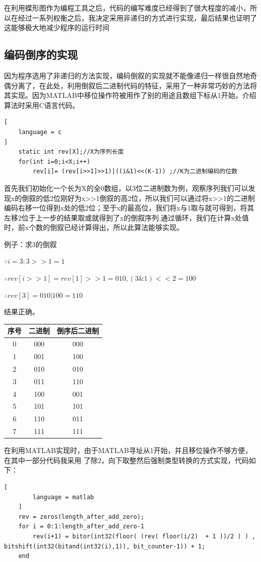 \documentclass{../source/zju}
\begin{document}
在利用蝶形图作为编程工具之后，代码的编写难度已经得到了很大程度的减小，所以在经过一系列权衡之后，我决定采用非递归的方式进行实现，最后结果也证明了这能够极大地减少程序的运行时间
\subsection{编码倒序的实现}
因为程序选用了非递归的方法实现，编码倒叙的实现就不能像递归一样很自然地奇偶分离了，在此处，利用倒叙后二进制代码的特征，采用了一种非常巧妙的方法将其实现。因为MATLAB中移位操作符被用作了别的用途且数组下标从1开始，介绍算法时采用C语言代码。
\begin{lstlisting}[
    language = c
]
    static int rev[X];//X为序列长度
    for(int i=0;i<X;i++)
        rev[i]= (rev[i>>1]>>1)|((i&1)<<(K-1)) ;//K为二进制编码的位数
\end{lstlisting}
首先我们初始化一个长为X的全0数组，以3位二进制数为例，观察序列我们可以发现x的倒叙的低2位刚好为x>>1倒叙的高2位，所以我们可以通过将x>>1的二进制编码右移一位得到x处的低2位；至于x的最高位，我们将x与1取与就可得到，将其左移2位于上一步的结果取或就得到了x的倒叙序列.通过循环，我们在计算x处值时，前x个数的倒叙已经计算得出，所以此算法能够实现。

例子：求3的倒叙

$\because  i = 3 ;3>>1 = 1$

$\therefore rev[i>>1] = rev[1] >> 1 = 010 ,(3\&1)<<2 = 100$

$\therefore rev[3] = 010 | 100 = 110$

结果正确。
\newpage
\begin{table}[htp]
    \centering
    \begin{tabular}{|c|c|c|}
    \hline
    序号 & 二进制 & 倒序后二进制 \\ \hline
    0  & 000 & 000    \\ \hline
    1  & 001 & 100    \\ \hline
    2  & 010 & 010    \\ \hline
    3  & 011 & 110    \\ \hline
    4  & 100 & 001    \\ \hline
    5  & 101 & 101    \\ \hline
    6  & 110 & 011    \\ \hline
    7  & 111 & 111    \\ \hline
    \end{tabular}
    \end{table}

    在利用MATLAB实现时，由于MATLAB寻址从1开始，并且移位操作不够方便，在其中一部分代码我采用 了除2，向下取整然后强制类型转换的方式实现，代码如下：
    \begin{lstlisting}[
        language = matlab
    ]
    rev = zeros(length_after_add_zero);
    for i = 0:1:length_after_add_zero-1
        rev(i+1) = bitor(int32(floor( (rev( floor(i/2)  + 1 ))/2 ) ) , bitshift(int32(bitand(int32(i),1)), bit_counter-1)) + 1;
    end
    \end{lstlisting}
\end{document}
